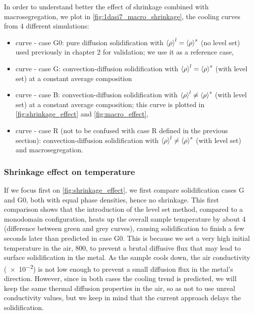 In order to understand better the effect of shrinkage combined with macrosegregation, we plot in \cref{fig:1dasi7_macro_shrinkage},
the cooling curves from 4 different simulations: 
\begin{itemize}
\itemsep0em
\item {} curve - case G0: pure diffusion solidification with $\left \langle \rho \right \rangle^l=\left \langle \rho \right \rangle^s$ (no level set) used previously in chapter 2 for validation;
we use it as a reference case,
\item {} curve - case G: convection-diffusion solidification with $\left \langle \rho \right \rangle^l=\left \langle \rho \right \rangle^s$ (with level set) at a constant average composition
\item {} curve - case B: convection-diffusion solidification with $\left \langle \rho \right \rangle^l \neq \left \langle \rho \right \rangle^s$ (with level set) at a constant average composition; this curve is plotted in 
\cref{fig:shrinkage_effect} and \cref{fig:macro_effect},
\item {} curve - case R (not to be confused with case R defined in the previous section): 
convection-diffusion solidification with $\left \langle \rho \right \rangle^l \neq \left \langle \rho \right \rangle^s$ (with level set) and macrosegregation.
\end{itemize}

\subsubsection{Shrinkage effect on temperature}
If we focus first on \cref{fig:shrinkage_effect}, we first compare solidification cases G and G0, both with equal phase densities, hence no shrinkage.
This first comparison shows that the introduction of the level set method, compared to a monodomain configuration, heats up
the overall sample temperature by about \SI{4}{\udegC} (difference between green and grey curves), causing solidification to finish a few seconds later than predicted in case G0.
This is because we set a very high initial temperature in the air, \SI{800}{\udegC}, to prevent a brutal diffusive flux that may lead to surface solidification
in the metal. As the sample cools down, the air conductivity (\SI{e-2}{\uconductivity}) is not low enough to prevent a small diffusion flux in the metal's direction.
However, since in both cases the cooling trend is predicted, we will keep the same thermal diffusion properties in the air, so as not to use unreal conductivity values,
but we keep in mind that the current approach delays the solidification.


